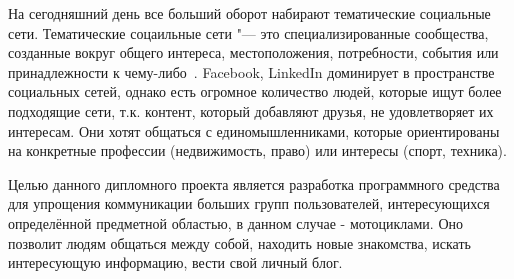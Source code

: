 На сегодняшний день все больший оборот набирают тематические социальные сети. Тематические соцаильные сети "--- это специализированные сообщества, созданные вокруг общего интереса, местоположения, потребности, события или принадлежности к чему-либо~\cite{verticalSN}. 
Facebook, LinkedIn доминирует в пространстве социальных сетей, однако есть огромное количество людей, которые ищут более подходящие сети, т.к. контент, который добавляют друзья, не удовлетворяет их интересам.
Они хотят общаться с единомышленниками, которые ориентированы на конкретные профессии (недвижимость, право) или интересы (спорт, техника). 

Целью данного дипломного проекта является разработка программного средства 
для упрощения коммуникации больших групп пользователей,
интересующихся определённой предметной областью, в данном случае -
мотоциклами. Оно позволит людям общаться между собой, находить новые
знакомства, искать интересующую информацию, вести свой личный блог.